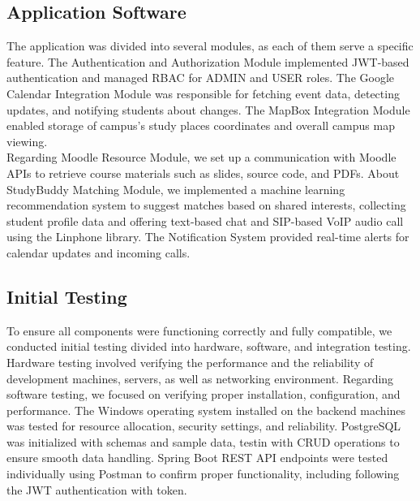 \documentclass[12pt]{article}
\begin{document}
\subsection{Application Software} 
The application was divided into several modules, as each of them serve a specific feature.
The Authentication and Authorization Module implemented JWT-based authentication and managed RBAC for ADMIN and USER roles.
The Google Calendar Integration Module was responsible for fetching event data, detecting updates, and notifying students about changes.
The MapBox Integration Module enabled storage of campus's study places coordinates and overall campus map viewing. \\

Regarding Moodle Resource Module, we set up a communication with Moodle APIs to retrieve course materials such as slides, source code, and PDFs.
About StudyBuddy Matching Module, we implemented a machine learning recommendation system to suggest matches based on shared interests, collecting student profile data and offering text-based chat and SIP-based VoIP audio call using the Linphone library.
The Notification System provided real-time alerts for calendar updates and incoming calls.

\subsection{Initial Testing}
To ensure all components were functioning correctly and fully compatible, we conducted initial testing divided into hardware, software, and integration testing. Hardware testing involved verifying the performance and the reliability of development machines, servers, as well as networking environment. 
Regarding software testing, we focused on verifying proper installation, configuration, and performance. The Windows operating system installed on the backend machines was tested for resource allocation, security settings, and reliability.
PostgreSQL was initialized with schemas and sample data, testin with CRUD operations to ensure smooth data handling. 
Spring Boot REST API endpoints were tested individually using Postman to confirm proper functionality, including following the JWT authentication with token. \\ 
\end{document}
